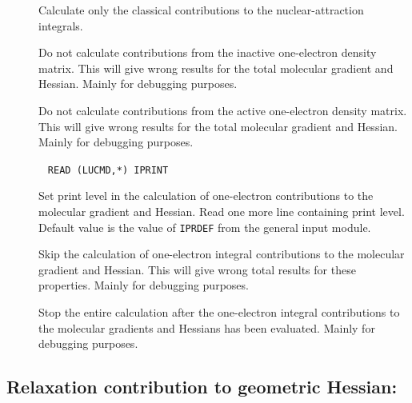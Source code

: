 \begin{description}
\item[] Calculate only the classical contributions to the
nuclear-attraction integrals.

\item[] Do not calculate contributions from the inactive
one-electron density matrix. This will give wrong results for the
total molecular gradient and
Hessian. Mainly for debugging
purposes.

\item[] Do not calculate contributions from the active
one-electron density matrix. This will give wrong results for the
total molecular gradient and Hessian. Mainly for debugging purposes.

\item[]\verb| |\newline
\verb|READ (LUCMD,*) IPRINT|

Set print level in the calculation of one-electron contributions to
the molecular gradient and Hessian.  Read one more line containing
print level. Default value is the value of \verb|IPRDEF| from the
general input module.

\item[] Skip the calculation of one-electron integral
contributions to the molecular gradient and Hessian. This will give
wrong total results for these properties. Mainly for debugging
purposes.

\item[] Stop the entire calculation after the
one-electron integral contributions to the molecular gradients and
Hessians has been evaluated. Mainly for debugging purposes.
\end{description}

\subsection{Relaxation contribution to geometric Hessian: }

